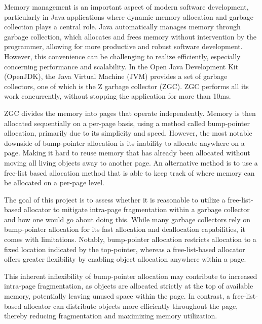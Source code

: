 

Memory management is an important aspect of modern software development, particularly in Java applications where dynamic memory allocation and garbage collection plays a central role. Java automatically manages memory through garbage collection, which allocates and frees memory without intervention by the programmer, allowing for more productive and robust software development. However, this convenience can be challenging to realize efficiently, especially concerning performance and scalability. In the Open Java Development Kit (OpenJDK), the Java Virtual Machine (JVM) provides a set of garbage collectors, one of which is the Z garbage collector (ZGC). ZGC performs all its work concurrently, without stopping the application for more than 10ms.

ZGC divides the memory into pages that operate independently. Memory is then allocated sequentially on a per-page basis, using a method called bump-pointer allocation, primarily due to its simplicity and speed. However, the most notable downside of bump-pointer allocation is its inability to allocate anywhere on a page. Making it hard to reuse memory that has already been allocated without moving all living objects away to another page. An alternative method is to use a free-list based allocation method that is able to keep track of where memory can be allocated on a per-page level.


The goal of this project is to assess whether it is reasonable to utilize a free-list-based allocator to mitigate intra-page fragmentation within a garbage collector and how one would go about doing this. While many garbage collectors rely on bump-pointer allocation for its fast allocation and deallocation capabilities, it comes with limitations. Notably, bump-pointer allocation restricts allocation to a fixed location indicated by the top-pointer, whereas a free-list-based allocator offers greater flexibility by enabling object allocation anywhere within a page.

This inherent inflexibility of bump-pointer allocation may contribute to increased intra-page fragmentation, as objects are allocated strictly at the top of available memory, potentially leaving unused space within the page. In contrast, a free-list-based allocator can distribute objects more efficiently throughout the page, thereby reducing fragmentation and maximizing memory utilization.

